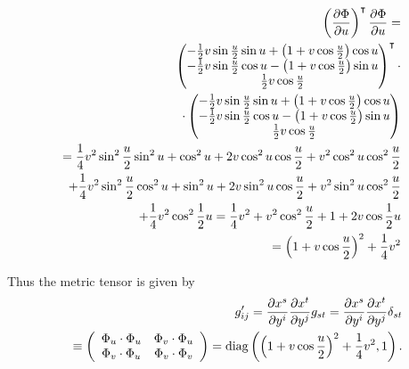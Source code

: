 {\begin{equation}
\begin{split}
\left(\frac{\partial \Phi }{\partial u}\right)^\intercal \frac{\partial \Phi }{\partial u}
=
\\
\begin{pmatrix}
-\frac{1}{2}v\sin \frac{u}{2}\sin u+\left( 1+v\cos \frac{u}{2}\right) \cos
u \\
-\frac{1}{2}v\sin \frac{u}{2}\cos u-\left( 1+v\cos \frac{u}{2}\right) \sin
u \\
\frac{1}{2}v\cos \frac{u}{2}
\end{pmatrix}^\intercal     \cdot
\\
\cdot
\begin{pmatrix}
-\frac{1}{2}v\sin \frac{u}{2}\sin u+\left( 1+v\cos \frac{u}{2}\right) \cos
u \\
-\frac{1}{2}v\sin \frac{u}{2}\cos u-\left( 1+v\cos \frac{u}{2}\right) \sin
u \\
\frac{1}{2}v\cos \frac{u}{2}
\end{pmatrix}
 \\
=
\frac{1}{4}v^{2}\sin ^{2}\frac{u}{2}\sin ^{2}u+\cos
^{2}u+2 v \cos ^{2}u \cos \frac{u}{2}+
v^{2}\cos ^{2}u  \cos ^{2}\frac{u}{2}
\\
+\frac{1}{4}v^{2}\sin ^{2}\frac{u}{2}\cos^{2}u
+\sin ^{2}u+2  v\sin ^{2}u\cos \frac{u}{2}+ v^{2} \sin^{2}u\cos ^{2}\frac{u}{2}
 \\
+\frac{1}{4}v^{2}\cos ^{2}\frac{1}{2}%
u =\allowbreak \frac{1}{4}v^{2}+v^{2}\cos ^{2}\frac{u}{2}+1+2v\cos \frac{%
1}{2}u
 \\
=\left(1+v\cos \frac{u}{2}\right)^{2}+\frac{1}{4}v^{2}
\end{split}
\end{equation}


Thus the metric tensor is given by
\begin{equation}
\begin{split}
g'_{ij}
= {\partial {x}^s\over \partial { y }^i}{\partial {x}^t\over \partial { y }^j}g_{st}
= {\partial {x}^s\over \partial { y }^i}{\partial {x}^t\over \partial { y }^j}\delta_{st}\\
\quad \equiv
\left(
\begin{array}{cc}
\Phi _{u}\cdot \Phi _{u} & \Phi _{v}\cdot \Phi _{u} \\
\Phi _{v}\cdot \Phi _{u} & \Phi _{v}\cdot \Phi _{v}
\end{array}
\right) ={\rm diag}\left(
\left(1+v\cos \frac{u}{2}\right)^{2}+\frac{1}{4}v^{2} , 1\right).
\end{split}
\end{equation}

\eexample
}






